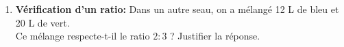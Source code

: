 \documentclass[a4paper]{book}
\begin{document}
\begin{exercice}
\begin{enumerate}
            Calculer le volume de peinture bleue et le volume de peinture verte nécessaires.
            \begin{ZoneReponse}{4cm}
            \end{ZoneReponse}
            
            \item \textbf{Vérification d'un ratio:} Dans un autre seau, on a mélangé 12 L de bleu et 20 L de vert.\\
            Ce mélange respecte-t-il le ratio $2:3$ ? Justifier la réponse.
            \begin{ZoneReponse}{4cm}
            \end{ZoneReponse}
        \end{enumerate}
    \end{exercice}
\end{document}

